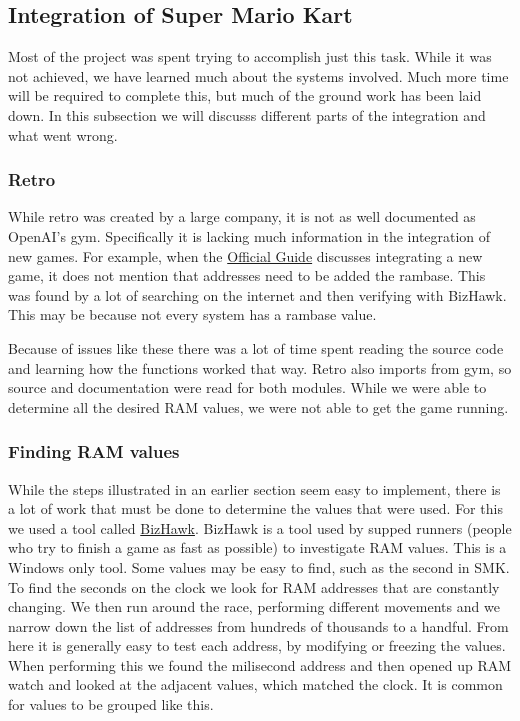 \documentclass[12pt,letter]{article}
\begin{document}
\subsection{Integration of Super Mario Kart}
Most of the project was spent trying to accomplish just this task. While it was
not achieved, we have learned much about the systems involved. Much more time 
will be required to complete this, but much of the ground work has been laid 
down. In this subsection we will discusss different parts of the integration
and what went wrong.

\subsubsection{Retro}
While retro was created by a large company, it is not as well documented as
OpenAI's gym. Specifically it is lacking much information in the integration
of new games. For example, when the 
\href{https://retro.readthedocs.io/en/latest/integration.html#integrating-a-game}
{Official Guide} discusses integrating a new game, it does not mention that
addresses need to be added the rambase. This was found by a lot of searching
on the internet and then verifying with BizHawk. This may be because not every
system has a rambase value. 

Because of issues like these there was a lot of time spent reading the source
code and learning how the functions worked that way. Retro also imports from
gym, so source and documentation were read for both modules. While we were able
to determine all the desired RAM values, we were not able to get the game running.

\subsubsection{Finding RAM values}
While the steps illustrated in an earlier section seem easy to implement, 
there is a lot of work that must be done to determine the values that were used. 
For this we used a tool called 
\href{https://github.com/TASVideos/BizHawk/}{BizHawk}. BizHawk is a tool
used by supped runners (people who try to finish a game as fast as possible) to 
investigate RAM values. This is a Windows only tool. Some values may be easy to
find, such as the second in SMK. To find the seconds on the clock we look for
RAM addresses that are constantly changing. We then run around the race, performing
different movements and we narrow down the list of addresses from hundreds of 
thousands to a handful. From here it is generally easy to test each address, by
modifying or freezing the values. When performing this we found the milisecond
address and then opened up RAM watch and looked at the adjacent values, which 
matched the clock. It is common for values to be grouped like this. 
\end{document}
